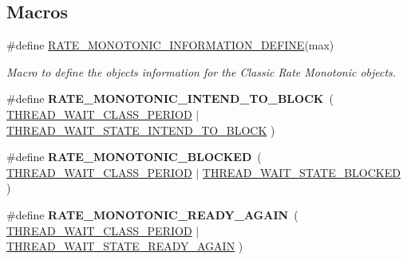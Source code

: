 \subsection*{Macros}
\begin{DoxyCompactItemize}
\item 
\#define \mbox{\hyperlink{group__ClassicRateMonImpl_ga3dd4851012025d1535bd915e62316333}{R\+A\+T\+E\+\_\+\+M\+O\+N\+O\+T\+O\+N\+I\+C\+\_\+\+I\+N\+F\+O\+R\+M\+A\+T\+I\+O\+N\+\_\+\+D\+E\+F\+I\+NE}}(max)
\begin{DoxyCompactList}\small\item\em Macro to define the objects information for the Classic Rate Monotonic objects. \end{DoxyCompactList}\item 
\mbox{\label{group__ClassicRateMonImpl_ga968d631ebb9ad4da75b05439ed2652b7}} 
\#define {\bfseries R\+A\+T\+E\+\_\+\+M\+O\+N\+O\+T\+O\+N\+I\+C\+\_\+\+I\+N\+T\+E\+N\+D\+\_\+\+T\+O\+\_\+\+B\+L\+O\+CK}~( \mbox{\hyperlink{group__RTEMSScoreThread_ga3c32beedd8bfee369f065b40a33a8af7}{T\+H\+R\+E\+A\+D\+\_\+\+W\+A\+I\+T\+\_\+\+C\+L\+A\+S\+S\+\_\+\+P\+E\+R\+I\+OD}} $\vert$ \mbox{\hyperlink{group__RTEMSScoreThread_ga82059fe7353c5129db4c812b7c82f6bf}{T\+H\+R\+E\+A\+D\+\_\+\+W\+A\+I\+T\+\_\+\+S\+T\+A\+T\+E\+\_\+\+I\+N\+T\+E\+N\+D\+\_\+\+T\+O\+\_\+\+B\+L\+O\+CK}} )
\item 
\mbox{\label{group__ClassicRateMonImpl_gac7a9b56bb5100e4b111b1405d73dbb11}} 
\#define {\bfseries R\+A\+T\+E\+\_\+\+M\+O\+N\+O\+T\+O\+N\+I\+C\+\_\+\+B\+L\+O\+C\+K\+ED}~( \mbox{\hyperlink{group__RTEMSScoreThread_ga3c32beedd8bfee369f065b40a33a8af7}{T\+H\+R\+E\+A\+D\+\_\+\+W\+A\+I\+T\+\_\+\+C\+L\+A\+S\+S\+\_\+\+P\+E\+R\+I\+OD}} $\vert$ \mbox{\hyperlink{group__RTEMSScoreThread_gaa9487eb8db998d29cb1f712155769583}{T\+H\+R\+E\+A\+D\+\_\+\+W\+A\+I\+T\+\_\+\+S\+T\+A\+T\+E\+\_\+\+B\+L\+O\+C\+K\+ED}} )
\item 
\mbox{\label{group__ClassicRateMonImpl_gaa8b22011c290036368da565a7254858f}} 
\#define {\bfseries R\+A\+T\+E\+\_\+\+M\+O\+N\+O\+T\+O\+N\+I\+C\+\_\+\+R\+E\+A\+D\+Y\+\_\+\+A\+G\+A\+IN}~( \mbox{\hyperlink{group__RTEMSScoreThread_ga3c32beedd8bfee369f065b40a33a8af7}{T\+H\+R\+E\+A\+D\+\_\+\+W\+A\+I\+T\+\_\+\+C\+L\+A\+S\+S\+\_\+\+P\+E\+R\+I\+OD}} $\vert$ \mbox{\hyperlink{group__RTEMSScoreThread_gac00cb9ccdda63a4731f4d80a89371ea0}{T\+H\+R\+E\+A\+D\+\_\+\+W\+A\+I\+T\+\_\+\+S\+T\+A\+T\+E\+\_\+\+R\+E\+A\+D\+Y\+\_\+\+A\+G\+A\+IN}} )
\end{DoxyCompactItemize}

